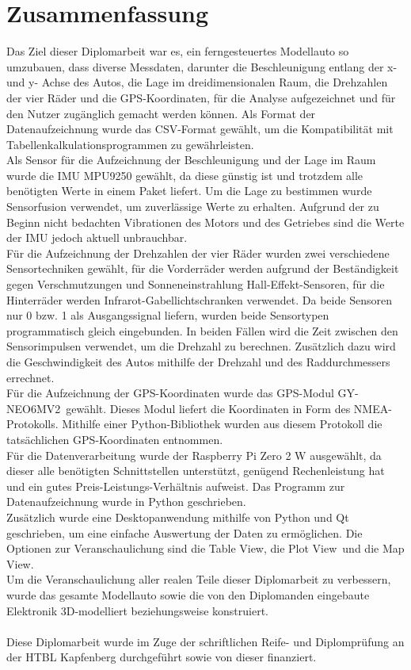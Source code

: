 \section{Zusammenfassung}
\label{sec:zusammenfassung}
Das Ziel dieser Diplomarbeit war es, ein ferngesteuertes Modellauto so umzubauen, dass diverse Messdaten, darunter die Beschleunigung entlang der x- und y- Achse des Autos, die Lage im dreidimensionalen Raum, die Drehzahlen der vier Räder und die \ac{GPS}-Koordinaten, für die Analyse aufgezeichnet und für den Nutzer zugänglich gemacht werden können. Als Format der Datenaufzeichnung wurde das \ac{CSV}-Format gewählt, um die Kompatibilität mit Tabellenkalkulationsprogrammen zu gewährleisten.\\
Als Sensor für die Aufzeichnung der Beschleunigung und der Lage im Raum wurde die \ac{IMU} MPU9250 gewählt, da diese günstig ist und trotzdem alle benötigten Werte in einem Paket liefert. Um die Lage zu bestimmen wurde Sensorfusion verwendet, um zuverlässige Werte zu erhalten. Aufgrund der zu Beginn nicht bedachten Vibrationen des Motors und des Getriebes sind die Werte der \ac{IMU} jedoch aktuell unbrauchbar.\\
Für die Aufzeichnung der Drehzahlen der vier Räder wurden zwei verschiedene Sensortechniken gewählt, für die Vorderräder werden aufgrund der Beständigkeit gegen Verschmutzungen und Sonneneinstrahlung Hall-Effekt-Sensoren, für die Hinterräder werden Infrarot-Gabellichtschranken verwendet. Da beide Sensoren nur 0 bzw. 1 als Ausgangssignal liefern, wurden beide Sensortypen programmatisch gleich eingebunden. In beiden Fällen wird die Zeit zwischen den Sensorimpulsen verwendet, um die Drehzahl zu berechnen. Zusätzlich dazu wird die Geschwindigkeit des Autos mithilfe der Drehzahl und des Raddurchmessers errechnet.\\
Für die Aufzeichnung der \ac{GPS}-Koordinaten wurde das \ac{GPS}-Modul \glqq GY-NEO6MV2\grqq\ gewählt. Dieses Modul liefert die Koordinaten in Form des \ac{NMEA}-Protokolls. Mithilfe einer Python-Bibliothek wurden aus diesem Protokoll die tatsächlichen \ac{GPS}-Koordinaten entnommen.\\
Für die Datenverarbeitung wurde der Raspberry Pi Zero 2 W ausgewählt, da dieser alle benötigten Schnittstellen unterstützt, genügend Rechenleistung hat und ein gutes Preis-Leistungs-Verhältnis aufweist. Das Programm zur Datenaufzeichnung wurde in Python geschrieben.\\
Zusätzlich wurde eine Desktopanwendung mithilfe von Python und Qt geschrieben, um eine einfache Auswertung der Daten zu ermöglichen. Die Optionen zur Veranschaulichung sind die \glqq Table View\grqq , die \glqq Plot View\grqq\ und die \glqq Map View\grqq .\\
Um die Veranschaulichung aller realen Teile dieser Diplomarbeit zu verbessern, wurde das gesamte Modellauto sowie die von den Diplomanden eingebaute Elektronik \ac{3D}-modelliert beziehungsweise konstruiert. \\
\\
Diese Diplomarbeit wurde im Zuge der schriftlichen Reife- und Diplomprüfung an der HTBL Kapfenberg durchgeführt sowie von dieser finanziert.